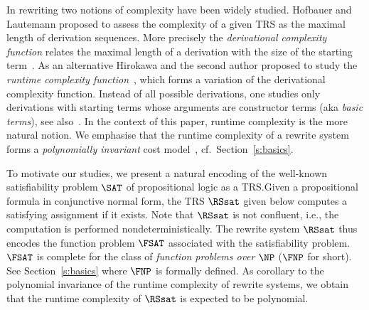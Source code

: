 \documentclass{LMCS}
\begin{document}
In rewriting two notions of complexity have been widely studied. 
Hofbauer and Lautemann proposed to assess the complexity of a given TRS 
as the maximal length of derivation sequences. More precisely
the \emph{derivational complexity function} relates the maximal length of a 
derivation with the size of the starting term~\cite{HL89}. 
As an alternative Hirokawa and the second author proposed to study the 
\emph{runtime complexity function}~\cite{HM08}, which forms a variation
of the derivational complexity function. Instead of all possible derivations,
one studies only derivations with starting terms whose arguments are constructor terms
(aka \emph{basic terms}), see also~\cite{BCMT01}.
In the context of this paper, runtime complexity is the more natural notion. 
We emphasise that the runtime complexity of a rewrite system
forms a \emph{polynomially invariant} cost model~\cite{Boas:TCS:90}, cf.~Section~\ref{s:basics}.

To motivate our studies, we present a natural encoding of
the well-known satisfiability problem $\SAT$ of propositional logic 
as a TRS.\@ Given a propositional formula in conjunctive normal form, 
the TRS $\RSsat$ given below computes a satisfying assignment if it exists.
Note that $\RSsat$ is not confluent, i.e., the computation is performed 
nondeterministically. 
The rewrite system $\RSsat$ thus encodes 
the function problem \emph{$\FSAT$} associated with the satisfiability
problem. 
$\FSAT$ is complete for the class of \emph{function problems over $\NP$} 
($\FNP$ for short). See Section~\ref{s:basics} where $\FNP$ is formally defined. 
As corollary to the polynomial invariance of
the runtime complexity of rewrite systems, we obtain that the runtime complexity
of $\RSsat$ is expected to be polynomial.
\end{document}
